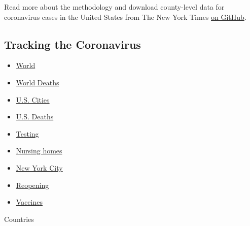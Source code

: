 Read more about the methodology and download county-level data for
coronavirus cases in the United States from The New York Times
\href{https://github.com/nytimes/covid-19-data}{on GitHub}.

\hypertarget{tracking-the-coronavirus}{%
\subsection{Tracking the Coronavirus}\label{tracking-the-coronavirus}}

\begin{itemize}
\tightlist
\item
  \href{https://www.nytimes.com/interactive/2020/world/coronavirus-maps.html}{World}
\item
  \href{https://www.nytimes.com/interactive/2020/04/21/world/coronavirus-missing-deaths.html}{World
  Deaths}
\item
  \href{https://www.nytimes.com/interactive/2020/04/23/upshot/five-ways-to-monitor-coronavirus-outbreak-us.html}{U.S.
  Cities}
\item
  \href{https://www.nytimes.com/interactive/2020/05/05/us/coronavirus-death-toll-us.html}{U.S.
  Deaths}
\item
  \href{https://www.nytimes.com/interactive/2020/us/coronavirus-testing.html}{Testing}
\item
  \href{https://www.nytimes.com/interactive/2020/us/coronavirus-nursing-homes.html}{Nursing
  homes}
\item
  \href{https://www.nytimes.com/interactive/2020/nyregion/new-york-city-coronavirus-cases.html}{New
  York City}
\item
  \href{https://www.nytimes.com/interactive/2020/us/states-reopen-map-coronavirus.html}{Reopening}
\item
  \href{https://www.nytimes.com/interactive/2020/science/coronavirus-vaccine-tracker.html}{Vaccines}
\end{itemize}

Countries

